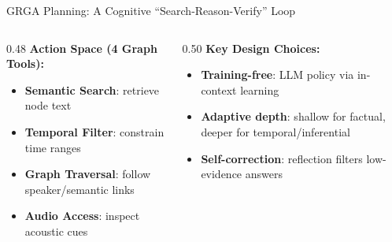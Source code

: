 \documentclass[aspectratio=169,10pt]{beamer}
\newcommand{\tightitems}{\setlength\itemsep{0.12em}\setlength\parsep{0pt}\setlength\topsep{0.1em}}
\begin{document}
\begin{frame}[t]{GRGA Planning: A Cognitive ``Search-Reason-Verify'' Loop}
  \vspace{0.14cm}
  \begin{columns}[T]
    \begin{column}{0.48\textwidth}
      \textbf{\color{ACLBlue}Action Space (4 Graph Tools):}
      \footnotesize
      \begin{itemize}\tightitems
        \item \textbf{Semantic Search}: retrieve node text
        \item \textbf{Temporal Filter}: constrain time ranges
        \item \textbf{Graph Traversal}: follow speaker/semantic links
        \item \textbf{Audio Access}: inspect acoustic cues
      \end{itemize}
    \end{column}
    \begin{column}{0.50\textwidth}
      \textbf{\color{ACLBlue}Key Design Choices:}
      \footnotesize
      \begin{itemize}\tightitems
        \item \textbf{Training-free}: LLM policy via in-context learning
        \item \textbf{Adaptive depth}: shallow for factual, deeper for temporal/inferential
        \item \textbf{Self-correction}: reflection filters low-evidence answers
      \end{itemize}
    \end{column}
  \end{columns}
\end{frame}
\end{document}
